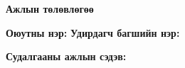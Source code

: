 

\begin{center}
{\Large\textbf{Ажлын төлөвлөгөө}}
\end{center}

\vspace{0.3cm}

\noindent\textbf{Оюутны нэр:} \authorshort \hfill \textbf{Удирдагч багшийн нэр:} \supervisor

\noindent\textbf{Судалгааны ажлын сэдэв:} \ttitle

\vspace{0.5cm}

